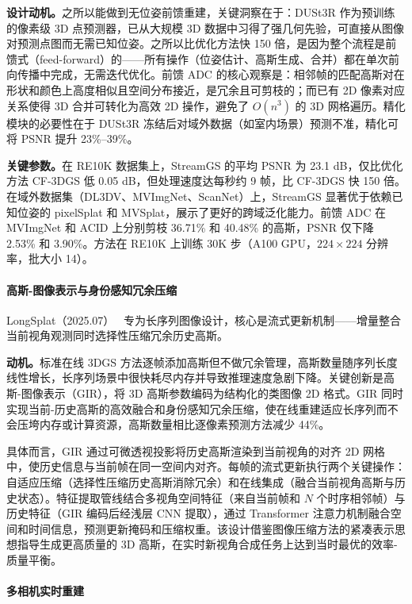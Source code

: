 \textbf{设计动机。}之所以能做到无位姿前馈重建，关键洞察在于：DUSt3R 作为预训练的像素级 3D 点预测器，已从大规模 3D 数据中习得了强几何先验，可直接从图像对预测点图而无需已知位姿。之所以比优化方法快 150 倍，是因为整个流程是前馈式（feed-forward）的——所有操作（位姿估计、高斯生成、合并）都在单次前向传播中完成，无需迭代优化。前馈 ADC 的核心观察是：相邻帧的匹配高斯对在形状和颜色上高度相似且空间分布接近，是冗余且可剪枝的；而已有 2D 像素对应关系使得 3D 合并可转化为高效 2D 操作，避免了 $O(n^3)$ 的 3D 网格遍历。精化模块的必要性在于 DUSt3R 冻结后对域外数据（如室内场景）预测不准，精化可将 PSNR 提升 23\%--39\%。

\textbf{关键参数。}在 RE10K 数据集上，StreamGS 的平均 PSNR 为 23.1 dB，仅比优化方法 CF-3DGS 低 0.05 dB，但处理速度达每秒约 9 帧，比 CF-3DGS 快 150 倍。在域外数据集（DL3DV、MVImgNet、ScanNet）上，StreamGS 显著优于依赖已知位姿的 pixelSplat 和 MVSplat，展示了更好的跨域泛化能力。前馈 ADC 在 MVImgNet 和 ACID 上分别剪枝 36.71\% 和 40.48\% 的高斯，PSNR 仅下降 2.53\% 和 3.90\%。方法在 RE10K 上训练 30K 步（A100 GPU，$224\times224$ 分辨率，批大小 14）。

\paragraph{高斯-图像表示与身份感知冗余压缩}

LongSplat（2025.07）~\cite{2507_16144} 专为长序列图像设计，核心是流式更新机制——增量整合当前视角观测同时选择性压缩冗余历史高斯。

\textbf{动机。}标准在线 3DGS 方法逐帧添加高斯但不做冗余管理，高斯数量随序列长度线性增长，长序列场景中很快耗尽内存并导致推理速度急剧下降。关键创新是高斯-图像表示（GIR），将 3D 高斯参数编码为结构化的类图像 2D 格式。GIR 同时实现当前-历史高斯的高效融合和身份感知冗余压缩，使在线重建适应长序列而不会压垮内存或计算资源，高斯数量相比逐像素预测方法减少 44\%。

具体而言，GIR 通过可微透视投影将历史高斯渲染到当前视角的对齐 2D 网格中，使历史信息与当前帧在同一空间内对齐。每帧的流式更新执行两个关键操作：自适应压缩（选择性压缩历史高斯消除冗余）和在线集成（融合当前视角高斯与历史状态）。特征提取管线结合多视角空间特征（来自当前帧和 $N$ 个时序相邻帧）与历史特征（GIR 编码后经浅层 CNN 提取），通过 Transformer 注意力机制融合空间和时间信息，预测更新掩码和压缩权重。该设计借鉴图像压缩方法的紧凑表示思想指导生成更高质量的 3D 高斯，在实时新视角合成任务上达到当时最优的效率-质量平衡。

\paragraph{多相机实时重建}

